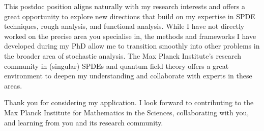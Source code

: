 \documentclass[11pt,a4paper]{moderncv}
\begin{document}
This postdoc position aligns naturally with my research interests and offers a great opportunity to explore new directions that build on my expertise in SPDE techniques, rough analysis, and functional analysis. While I have not directly worked on the precise area you specialise in, the methods and frameworks I have developed during my PhD allow me to transition smoothly into other problems in the broader area of stochastic analysis. The Max Planck Institute’s research community in (singular) SPDEs and quantum field theory offers a great environment to deepen my understanding and collaborate with experts in these areas.

Thank you for considering my application. I look forward to contributing to the Max Planck Institute for Mathematics in the Sciences, collaborating with you, and learning from you and its research community.


\vspace{0.5cm}

\makeletterclosing
\end{document}
